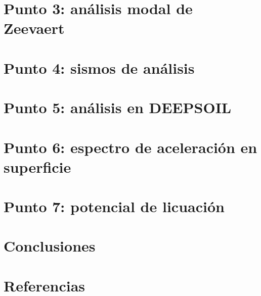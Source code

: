 \documentclass[12pt,oneside]{article}
\begin{document}
\section{Punto 3: análisis modal de Zeevaert}


\section{Punto 4: sismos de análisis}


\section{Punto 5: análisis en DEEPSOIL}


\section{Punto 6: espectro de aceleración en superficie}


\section{Punto 7: potencial de licuación}


\section{Conclusiones}


\section*{Referencias}
\small
\printbibliography[heading=none]
\end{document}
